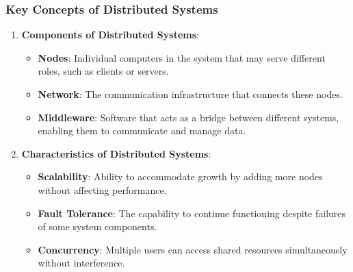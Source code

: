 \documentclass[aspectratio=169]{beamer}
\begin{document}
\begin{frame}[fragile]
  \frametitle{Key Concepts of Distributed Systems}
  \begin{enumerate}
    \item \textbf{Components of Distributed Systems}:
      \begin{itemize}
        \item \textbf{Nodes}: Individual computers in the system that may serve different roles, such as clients or servers.
        \item \textbf{Network}: The communication infrastructure that connects these nodes.
        \item \textbf{Middleware}: Software that acts as a bridge between different systems, enabling them to communicate and manage data.
      \end{itemize}
    
    \item \textbf{Characteristics of Distributed Systems}:
      \begin{itemize}
        \item \textbf{Scalability}: Ability to accommodate growth by adding more nodes without affecting performance.
        \item \textbf{Fault Tolerance}: The capability to continue functioning despite failures of some system components.
        \item \textbf{Concurrency}: Multiple users can access shared resources simultaneously without interference.
      \end{itemize}
  \end{enumerate}
\end{frame}
\end{document}
